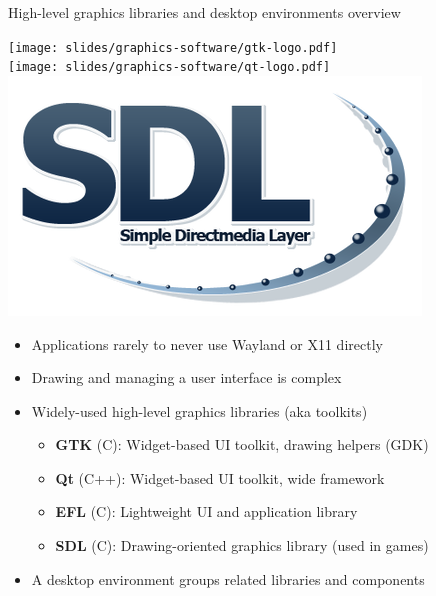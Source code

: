 \begin{frame}{High-level graphics libraries and desktop environments overview}
  \begin{minipage}[b]{0.09\textwidth}
  \centering
  \texttt{[image: slides/graphics-software/gtk-logo.pdf]}\\
  \vspace{3em}
  \texttt{[image: slides/graphics-software/qt-logo.pdf]}\\
  \vspace{3em}
  \includegraphics[width=\textwidth]{slides/graphics-software/sdl-logo.png}\\
  \vspace{2em}
  \end{minipage}
  \hfill
  \begin{minipage}[b]{0.8\textwidth}
  \begin{itemize}
  \item Applications rarely to never use Wayland or X11 directly
  \item Drawing and managing a user interface is complex
  \item Widely-used high-level graphics libraries (aka toolkits)
    \begin{itemize}
    \item \textbf{GTK} (C): Widget-based UI toolkit, drawing helpers (GDK)
    \item \textbf{Qt} (C++): Widget-based UI toolkit, wide framework
    \item \textbf{EFL} (C): Lightweight UI and application library
    \item \textbf{SDL} (C): Drawing-oriented graphics library (used in games)
    \end{itemize}
  \item A desktop environment groups related libraries and components\\

\end{itemize}
\end{minipage}
\end{frame}
